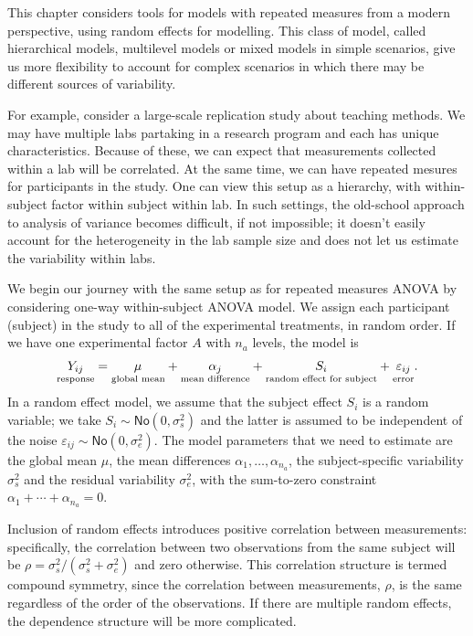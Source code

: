 \documentclass[
  11pt,
  letterpaper,
]{scrbook}
\theoremstyle{definition}
\theoremstyle{remark}
\begin{document}
This chapter considers tools for models with repeated measures from a
modern perspective, using random effects for modelling. This class of
model, called hierarchical models, multilevel models or mixed models in
simple scenarios, give us more flexibility to account for complex
scenarios in which there may be different sources of variability.

For example, consider a large-scale replication study about teaching
methods. We may have multiple labs partaking in a research program and
each has unique characteristics. Because of these, we can expect that
measurements collected within a lab will be correlated. At the same
time, we can have repeated mesures for participants in the study. One
can view this setup as a hierarchy, with within-subject factor within
subject within lab. In such settings, the old-school approach to
analysis of variance becomes difficult, if not impossible; it doesn't
easily account for the heterogeneity in the lab sample size and does not
let us estimate the variability within labs.

We begin our journey with the same setup as for repeated measures ANOVA
by considering one-way within-subject ANOVA model. We assign each
participant (subject) in the study to all of the experimental
treatments, in random order. If we have one experimental factor \(A\)
with \(n_a\) levels, the model is
\begin{align*}\underset{\text{response}\vphantom{l}}{Y_{ij}} = \underset{\text{global mean}}{\mu_{\vphantom{j}}} + \underset{\text{mean difference}}{\alpha_j} + \underset{\text{random effect for subject}}{S_{i\vphantom{j}}} + \underset{\text{error}\vphantom{l}}{\varepsilon_{ij}}.
\end{align*} In a random effect model, we assume that the subject effect
\(S_i\) is a random variable; we take
\(S_i \sim \mathsf{No}(0, \sigma^2_s)\) and the latter is assumed to be
independent of the noise
\(\varepsilon_{ij} \sim \mathsf{No}(0, \sigma^2_e)\). The model
parameters that we need to estimate are the global mean \(\mu\), the
mean differences \(\alpha_1, \ldots, \alpha_{n_a}\), the
subject-specific variability \(\sigma^2_s\) and the residual variability
\(\sigma^2_e\), with the sum-to-zero constraint
\(\alpha_1 + \cdots + \alpha_{n_a}=0\).

Inclusion of random effects introduces positive correlation between
measurements: specifically, the correlation between two observations
from the same subject will be
\(\rho=\sigma^2_s/(\sigma^2_s+\sigma^2_e)\) and zero otherwise. This
correlation structure is termed compound symmetry, since the correlation
between measurements, \(\rho\), is the same regardless of the order of
the observations. If there are multiple random effects, the dependence
structure will be more complicated.
\end{document}
